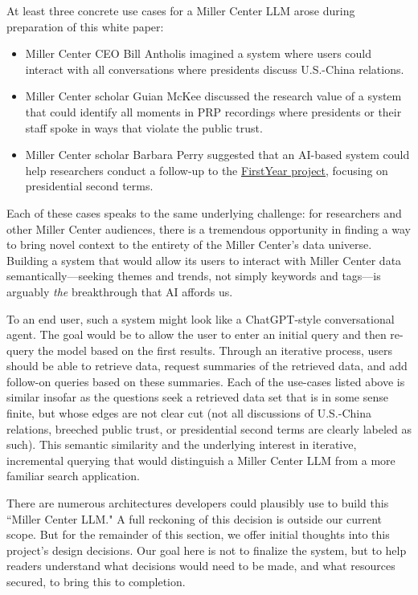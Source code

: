\documentclass[12pt, oneside]{article}   	%
\begin{document}
At least three concrete use cases for a Miller Center LLM arose during preparation of this white paper:
\begin{itemize}
\item Miller Center CEO Bill Antholis imagined a system where users could interact with all conversations where presidents discuss U.S.-China relations. 
\item Miller Center scholar Guian McKee discussed the research value of a system that could identify all moments in PRP recordings where presidents or their staff spoke in ways that violate the public trust.  
\item Miller Center scholar Barbara Perry suggested that an AI-based system could help researchers conduct a follow-up to the \href{firstyear2017.org}{FirstYear project}, focusing on presidential second terms.
\end{itemize}
Each of these cases speaks to the same underlying challenge: for researchers and other Miller Center audiences, there is a tremendous opportunity in finding a way to bring novel context to  the entirety of the Miller Center's data universe.  Building a system that would allow its users to interact with Miller Center data semantically---seeking themes and trends, not simply keywords and tags---is arguably \emph{the} breakthrough that AI affords us.

To an end user, such a system might look like a ChatGPT-style conversational agent.  The goal would be to allow the user to enter an initial query and then re-query the model based on the first results.  Through an iterative process, users should be able to retrieve data, request  summaries of the retrieved data, and add follow-on queries based on these summaries.  Each of the use-cases listed above is similar insofar as the questions seek a retrieved data set that is in some sense finite, but whose edges are not clear cut (not all discussions of U.S.-China relations, breeched public trust, or presidential second terms are clearly labeled as such).  This semantic similarity and the underlying interest in iterative, incremental querying that would distinguish a Miller Center LLM from a more familiar search application.

There are numerous architectures developers could plausibly use to build this ``Miller Center LLM."  A full reckoning of this decision is outside our current scope.  But for the remainder of this section, we offer initial thoughts into this project's design decisions.  Our goal here is not to finalize the system, but to help readers understand what decisions would need to be made, and what resources secured, to bring this to completion.
\end{document}
